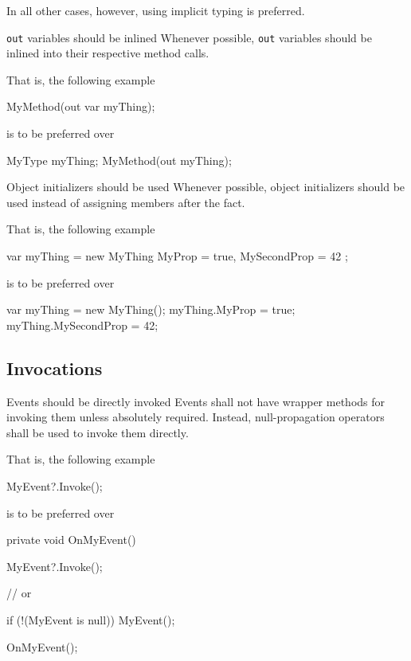 \documentclass[11pt,a4paper]{article}
\begin{document}
In all other cases, however, using implicit typing is preferred.

\begin{should}{\texttt{out} variables should be inlined}
Whenever possible, \texttt{out} variables should be inlined into their respective method calls.
\end{should}

That is, the following example 
\begin{code}
MyMethod(out var myThing);
\end{code}

is to be preferred over

\begin{code}
MyType myThing;
MyMethod(out myThing);
\end{code}

\begin{should}{Object initializers should be used}
Whenever possible, object initializers should be used instead of assigning members after the fact.
\end{should}

That is, the following example 
\begin{code}
var myThing = new MyThing
{
	MyProp = true,
	MySecondProp = 42
};
\end{code}

is to be preferred over

\begin{code}
var myThing = new MyThing();
myThing.MyProp = true;
myThing.MySecondProp = 42;
\end{code}

\subsection{Invocations}
\begin{should}{Events should be directly invoked}
Events shall not have wrapper methods for invoking them unless absolutely required. Instead, null-propagation operators shall be used to invoke them directly.
\end{should}

That is, the following example 
\begin{code}
MyEvent?.Invoke();
\end{code}

is to be preferred over

\begin{code}
private void OnMyEvent()
{
	MyEvent?.Invoke();
	
	// or
	
	if (!(MyEvent is null))
	{
		MyEvent();
	}
}

OnMyEvent();
\end{code}
\end{document}
